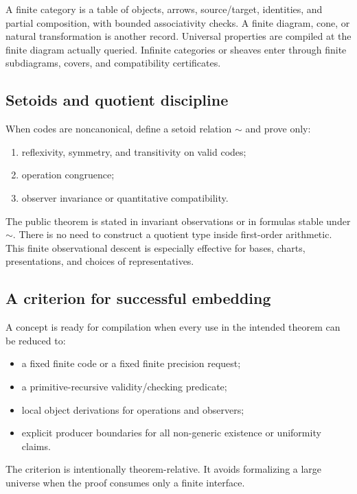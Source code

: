A finite category is a table of objects, arrows, source/target, identities, and partial composition,
with bounded associativity checks.  A finite diagram, cone, or natural transformation is another
record.  Universal properties are compiled at the finite diagram actually queried.  Infinite
categories or sheaves enter through finite subdiagrams, covers, and compatibility certificates.

\subsection{Setoids and quotient discipline}

When codes are noncanonical, define a setoid relation \(\sim\) and prove only:

\begin{enumerate}
\item reflexivity, symmetry, and transitivity on valid codes;
\item operation congruence;
\item observer invariance or quantitative compatibility.
\end{enumerate}

The public theorem is stated in invariant observations or in formulas stable under \(\sim\).  There
is no need to construct a quotient type inside first-order arithmetic.  This finite observational
descent is especially effective for bases, charts, presentations, and choices of representatives.

\subsection{A criterion for successful embedding}

A concept is ready for \TAPIR{} compilation when every use in the intended theorem can be reduced to:

\begin{itemize}
\item a fixed finite code or a fixed finite precision request;
\item a primitive-recursive validity/checking predicate;
\item local object derivations for operations and observers;
\item explicit producer boundaries for all non-generic existence or uniformity claims.
\end{itemize}

The criterion is intentionally theorem-relative.  It avoids formalizing a large universe when the
proof consumes only a finite interface.
